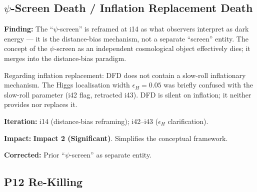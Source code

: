 \documentclass[11pt,a4paper]{article}
\newcommand{\imptwo}{\textcolor{impact2}{\textbf{Impact 2 (Significant)}}}
\begin{document}
\subsection{$\psi$-Screen Death / Inflation Replacement Death}
\label{sec:psi-screen}

\begin{tcolorbox}[colback=green!5!white, colframe=green!50!black,
  title=\textbf{$\psi$-Screen Reframing \& Inflation Status --- Iteration 14}]

\textbf{Finding:} The ``$\psi$-screen'' is reframed at i14 as what
observers interpret as dark energy --- it is the distance-bias mechanism,
not a separate ``screen'' entity. The concept of the $\psi$-screen as an
independent cosmological object effectively dies; it merges into the
distance-bias paradigm.

Regarding inflation replacement: DFD does not contain a slow-roll
inflationary mechanism. The Higgs localisation width $\epsilon_H = 0.05$
was briefly confused with the slow-roll parameter (i42 flag, retracted
i43). DFD is silent on inflation; it neither provides nor replaces it.

\textbf{Iteration:} i14 (distance-bias reframing); i42--i43 ($\epsilon_H$
clarification).

\textbf{Impact:} \imptwo. Simplifies the conceptual framework.

\textbf{Corrected:} Prior ``$\psi$-screen'' as separate entity.

\end{tcolorbox}

\subsection{P12 Re-Killing}
\label{sec:p12}
\end{document}
